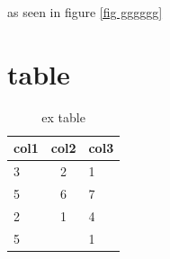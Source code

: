 \documentclass[a4paper,twocolumn]{article}
\begin{document}
as seen in figure \ref{fig gggggg}


\lipsum
\section{table}
\lipsum
\begin{table}
	\centering
	\resizebox{0.5\textwidth}{!} {
	\begin{tabular} {l|cl}
		\hline
		col1 & col2 & col3 \\ \hline
		3 & 2 & 1 \\ \hline
		5 & 6 & 7 \\ \hline
		2 & 1 & 4 \\ \hline
		5 &  & 1 \\ \hline		
	\end{tabular}
}
\caption{ex table}
\end{table}


  
\end{document}
